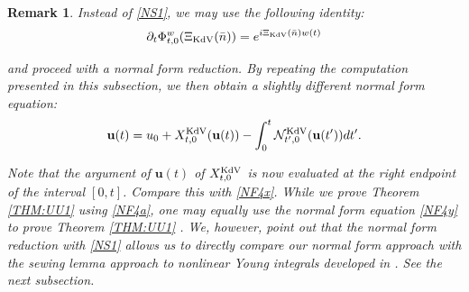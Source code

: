\documentclass[letterpaper, 11pt,  reqno]{amsart}
\newtheorem{remark}[theorem]{Remark}
\newcommand{\1}{\hspace{0.5mm}\text{I}\hspace{0.5mm}}
\newcommand{\noi}{\noindent}
\newcommand{\dt}{\partial_t}
\newcommand{\NN}{\mathcal{N}}
\newcommand{\uu}{\mathbf{u}}
\newcommand{\KDV}{\text{\rm KdV} }
\numberwithin{equation}{section}
\numberwithin{theorem}{section}
\begin{document}
\begin{remark}\rm

Instead of \eqref{NS1}, we may use the following identity:
\begin{align*}
\dt \Phi^w_{t, 0}(\Xi_\KDV (\bar n)) = e^{i \Xi_\KDV (\bar n)w(t)}
\end{align*}


\noi
and proceed with a normal form reduction.
By repeating the computation presented in this subsection, we
then obtain
a slightly different normal form equation:
\begin{align}
\begin{split}
\uu(t) 
 =  u_0 + 
 X^\KDV_{t, 0}(\uu (t) )
- 
\int_0^t 
\NN^\KDV_{t', 0}(\uu(t'))dt'.
\end{split}
\label{NF4y}
\end{align}


\noi
Note that the argument of $\uu (t)$
of $X^\KDV_{t, 0}$ is now evaluated at the right endpoint of the interval
$[0, t]$.
Compare this with \eqref{NF4x}.
While we prove Theorem \ref{THM:UU1} 
using \eqref{NF4a}, 
one may equally use the normal form equation \eqref{NF4y}
to prove Theorem \ref{THM:UU1} .
We, however, point out that
the normal form reduction with \eqref{NS1}
allows us to directly compare our normal form approach 
with the sewing lemma approach to nonlinear Young integrals
developed in \cite{CGLLO1}.
See the next subsection.




\end{remark}
\end{document}
